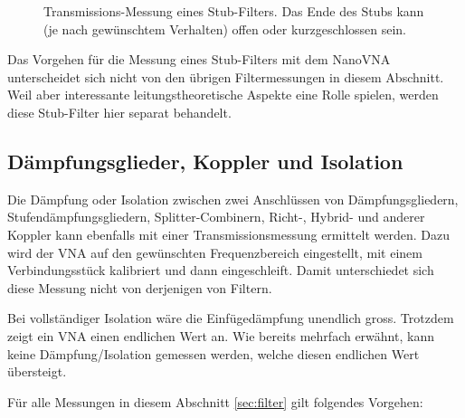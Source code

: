 \documentclass[twoside,a4paper,11pt,halfparskip,DIV=11,notitlepage]{scrartcl}
\begin{document}
\begin{figure}[t]
    \caption{Transmissions-Messung eines Stub-Filters. Das Ende des Stubs kann
    (je nach gewünschtem Verhalten) offen oder kurzgeschlossen sein.}
    \label{fig:quarterwavestub}
\end{figure}

Das Vorgehen für die Messung eines Stub-Filters mit dem NanoVNA unterscheidet
sich nicht von den übrigen Filtermessungen in diesem Abschnitt. Weil aber
interessante leitungstheoretische Aspekte eine Rolle spielen, werden diese
Stub-Filter hier separat behandelt.

\subsection{Dämpfungsglieder, Koppler und Isolation}
Die Dämpfung oder Isolation zwischen zwei Anschlüssen von Dämpfungsgliedern,
Stufendämpfungsgliedern, Splitter-Combinern, Richt-, Hybrid- und anderer Koppler
kann ebenfalls mit einer Transmissionsmessung ermittelt werden. Dazu wird der VNA auf den
gewünschten Frequenzbereich eingestellt, mit einem Verbindungsstück kalibriert
und dann eingeschleift. Damit unterschiedet sich diese Messung nicht von derjenigen
von Filtern.

Bei vollständiger Isolation wäre die Einfügedämpfung unendlich gross. Trotzdem
zeigt ein VNA einen endlichen Wert an. Wie bereits mehrfach erwähnt, kann
keine Dämpfung/Isolation gemessen werden, welche diesen endlichen Wert übersteigt.

Für alle Messungen in diesem Abschnitt \ref{sec:filter} gilt folgendes Vorgehen:
\end{document}
